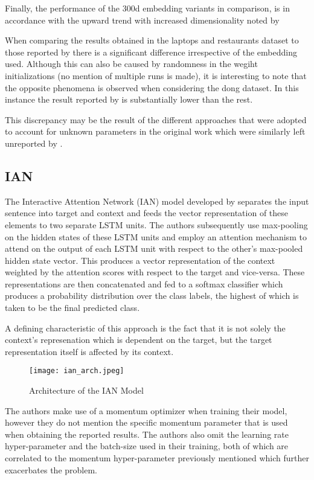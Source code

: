 \documentclass[../../fyp.tex]{subfiles}
\begin{document}
Finally, the performance of the 300d embedding variants in comparison, is in accordance with the upward trend with increased dimensionality noted by \citet{moore2018}

When comparing the results obtained in the laptops and restaurants dataset to those reported by \citet{chen2017} there is a significant difference irrespective of the embedding used. Although this can also be caused by randomness in the wegiht initializations (no mention of multiple runs is made), it is interesting to note that the opposite phenomena is observed when considering the dong dataset. In this instance the result reported by \citet{chen2017} is substantially lower than the rest.

This discrepancy may be the result of the different approaches that were adopted to account for unknown parameters in the original work \citep{tang2016b} which were similarly left unreported by \citet{chen2017}.

\subsection{IAN}

The Interactive Attention Network (IAN) model developed by \citet{dehongma2017} separates the input sentence into target and context and feeds the vector representation of these elements to two separate LSTM units. The authors subsequently use max-pooling on the hidden states of these LSTM units and employ an attention mechanism to attend on the output of each LSTM unit with respect to the other's max-pooled hidden state vector. This produces a vector representation of the context weighted by the attention scores with respect to the target and vice-versa. These representations are then concatenated and fed to a softmax classifier which produces a probability distribution over the class labels, the highest of which is taken to be the final predicted class. 

A defining characteristic of this approach is the fact that it is not solely the context's represenation which is dependent on the target, but the target representation itself is affected by its context. 

\begin{figure}[!ht]
	\centering
	\texttt{[image: ian\_arch.jpeg]}
	\caption{Architecture of the IAN Model \citep{dehongma2017}}
	\label{fig:ian_arch}
\end{figure}

The authors make use of a momentum optimizer when training their model, however they do not mention the specific momentum parameter that is used when obtaining the reported results. The authors also omit the learning rate hyper-parameter and the batch-size used in their training, both of which are correlated to the momentum hyper-parameter previously mentioned which further exacerbates the problem. 
\end{document}
